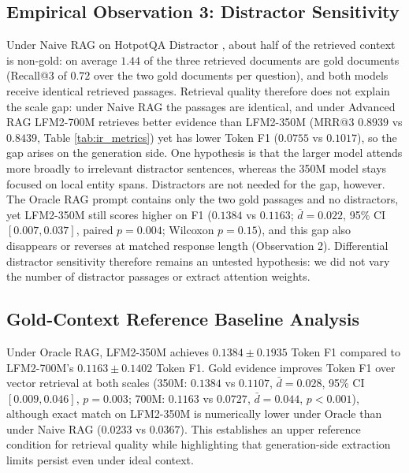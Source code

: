\documentclass[10pt]{article}
\begin{document}
\subsection{Empirical Observation 3: Distractor Sensitivity}
Under Naive RAG on HotpotQA Distractor \citep{yang2018hotpotqa}, about half of the retrieved context is non-gold: on average $1.44$ of the three retrieved documents are gold documents (Recall@3 of $0.72$ over the two gold documents per question), and both models receive identical retrieved passages. Retrieval quality therefore does not explain the scale gap: under Naive RAG the passages are identical, and under Advanced RAG LFM2-700M retrieves better evidence than LFM2-350M (MRR@3 $0.8939$ vs $0.8439$, Table \ref{tab:ir_metrics}) yet has lower Token F1 ($0.0755$ vs $0.1017$), so the gap arises on the generation side. One hypothesis is that the larger model attends more broadly to irrelevant distractor sentences, whereas the 350M model stays focused on local entity spans. Distractors are not needed for the gap, however. The Oracle RAG prompt contains only the two gold passages and no distractors, yet LFM2-350M still scores higher on F1 ($0.1384$ vs $0.1163$; $\bar{d}=0.022$, 95\% CI $[0.007, 0.037]$, paired $p=0.004$; Wilcoxon $p=0.15$), and this gap also disappears or reverses at matched response length (Observation 2). Differential distractor sensitivity therefore remains an untested hypothesis: we did not vary the number of distractor passages or extract attention weights.

\subsection{Gold-Context Reference Baseline Analysis}
Under Oracle RAG, LFM2-350M achieves $0.1384 \pm 0.1935$ Token F1 compared to LFM2-700M's $0.1163 \pm 0.1402$ Token F1. Gold evidence improves Token F1 over vector retrieval at both scales (350M: $0.1384$ vs $0.1107$, $\bar{d}=0.028$, 95\% CI $[0.009, 0.046]$, $p=0.003$; 700M: $0.1163$ vs $0.0727$, $\bar{d}=0.044$, $p<0.001$), although exact match on LFM2-350M is numerically lower under Oracle than under Naive RAG ($0.0233$ vs $0.0367$). This establishes an upper reference condition for retrieval quality while highlighting that generation-side extraction limits persist even under ideal context.
\end{document}
